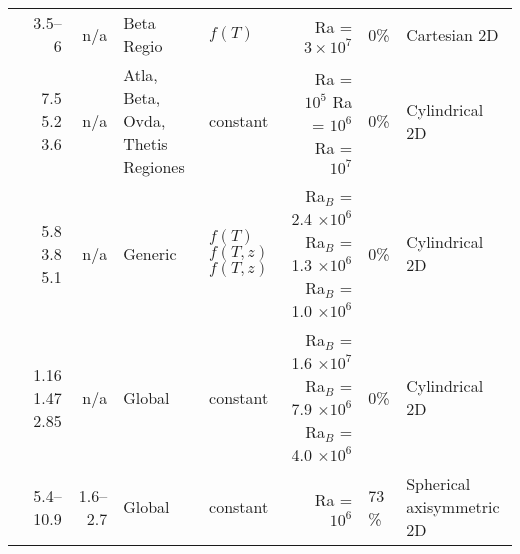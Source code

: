 \begin{landscape}
\begin{longtable}{ @{} p{4cm} r r p{2cm} p{2cm} r p{1.5cm} p{5cm} @{} }
\citet{Vezolainen2003} & 3.5--6 & n/a & Beta Regio & $f(T)$  & Ra = $3 \times 10^7$ & 0\% & Cartesian 2D   \\

\citet{Kiefer1991} & \makecell[tr]{7.5 \\ 5.2 \\ 3.6} & n/a  & Atla, Beta, Ovda, Thetis Regiones &  constant & \makecell[tr]{Ra = $10^5$ \\ Ra = $10^6$ \\ Ra = $10^7$} & 0\% & Cylindrical 2D   \\




\citet{Moresi1995} & \makecell[tr]{5.8 \\ 3.8 \\ 5.1} & n/a & Generic &  \makecell[tl]{$f(T)$ \\ $f(T,z)$ \\ $f(T,z)$} & \makecell[tr]{Ra$_B$ = 2.4 $\times 10^6$ \\ Ra$_B$ = 1.3 $\times 10^6$ \\ Ra$_B$ = 1.0 $\times 10^6$} & 0\% & Cylindrical 2D   \\

\citet{Nimmo1996} &  \makecell[tr]{1.16 \\ 1.47 \\ 2.85}  &  n/a  & Global & constant & \makecell[tr]{Ra$_B$ = 1.6 $\times 10^7$ \\  Ra$_B$ = 7.9 $\times 10^6$\\ Ra$_B$ = 4.0 $\times 10^6$ } & 0\% & Cylindrical 2D \\

\citet{Kiefer1998} &  5.4--10.9 & 1.6--2.7  & Global & constant & Ra = $10^6$ & 73 \% & Spherical axisymmetric 2D \\







\end{longtable}
\end{landscape}
